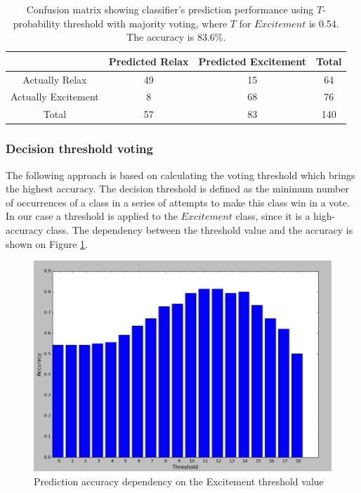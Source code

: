 \documentclass[12pt]{article}
\theoremstyle{definition}
\begin{document}
\begin{table}[H]
\begin{center}
  \begin{tabular}{ | c | c | c | c | }
    \hline
     & Predicted Relax & Predicted Excitement & Total \\ \hline
    Actually Relax & 49 & 15 & 64 \\ \hline
    Actually Excitement & 8 & 68 & 76 \\ \hline
    Total & 57 & 83 & 140 \\ 
    \hline
  \end{tabular}
\end{center}
\caption{Confusion matrix showing classifier's prediction performance using $T$-probability threshold with majority voting, where $T$ for $Excitement$ is 0.54. The accuracy is 83.6\%.} 
\end{table}

\subsubsection{Decision threshold voting}

The following approach is based on calculating the voting threshold which brings the highest accuracy. The decision threshold is defined as the minimum number of occurrences of a class in a series of attempts to make this class win in a vote. In our case a threshold is applied to the $Excitement$ class, since it is a high-accuracy class. The dependency between the threshold value and the accuracy is shown on Figure \ref{fig:fnCompModel}.

\begin{figure} [H]
\begin{center}
\includegraphics[width=1\textwidth]{threshold_accuracy_curve}
\caption{Prediction accuracy dependency on the Excitement threshold value}
\label{fig:fnCompModel}
\end{center}
\end{figure}
\end{document}
